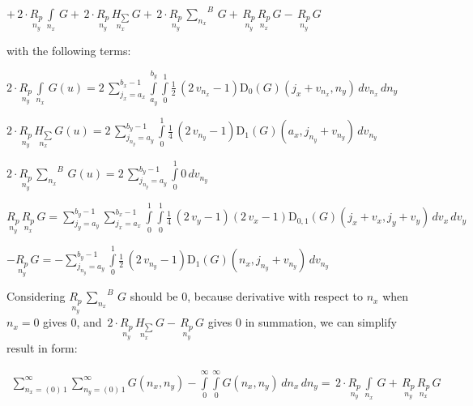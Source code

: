 \documentclass[11pt]{article}
\begin{document}
    \(+\,2\cdot\underset{n_y}{R_{p}}\,\int\limits_{n_x}^{}\,G +\,2\cdot\underset{n_y}{R_{p}}\,\underset{n_x}{H_{\sum}}\,G +\,2\cdot\underset{n_y}{R_{p}}\,{\sum\limits_{n_x}^{}}^{B}\,G +\,\underset{n_y}{R_{p}}\,\underset{n_x}{R_{p}}\,G -\,\underset{n_y}{R_{p}}\,G\)

    with the following terms:

\(2\cdot\underset{n_y}{R_{p}}\,\int\limits_{n_x}^{}\,G\left(u\right) = 2 \, {\sum\limits_{j_{x}=a_{x}}^{b_{x} - 1} \int\limits_{a_{y}}^{b_{y}} \int\limits_{0}^{1} \frac{1}{2} \, {\left(2 \, v_{n_{x}} - 1\right)} \mathrm{D}_{0}\left(G\right)\left(j_{x} + v_{n_{x}}, n_{y}\right)\,{d v_{n_{x}}}\,{d n_{y}}}\)

\(2\cdot\underset{n_y}{R_{p}}\,\underset{n_x}{H_{\sum}}\,G\left(u\right) = 2 \, {\sum\limits_{j_{n_{y}}=a_{y}}^{b_{y} - 1} \int\limits_{0}^{1} \frac{1}{4} \, {\left(2 \, v_{n_{y}} - 1\right)} \mathrm{D}_{1}\left(G\right)\left(a_{x}, j_{n_{y}} + v_{n_{y}}\right)\,{d v_{n_{y}}}}\)

\(2\cdot\underset{n_y}{R_{p}}\,{\sum\limits_{n_x}^{}}^{B}\,G\left(u\right) = 2 \, {\sum\limits_{j_{n_{y}}=a_{y}}^{b_{y} - 1} \int\limits_{0}^{1} 0\,{d v_{n_{y}}}}\)

\(\underset{n_y}{R_{p}}\,\underset{n_x}{R_{p}}\,G = {\sum\limits_{j_{y}=a_{y}}^{b_{y} - 1} {\sum\limits_{j_{x}=a_{x}}^{b_{x} - 1} \int\limits_{0}^{1} \int\limits_{0}^{1} \frac{1}{4} \, {\left(2 \, v_{y} - 1\right)} {\left(2 \, v_{x} - 1\right)} \mathrm{D}_{0, 1}\left(G\right)\left(j_{x} + v_{x}, j_{y} + v_{y}\right)\,{d v_{x}}}\,{d v_{y}}}\)

\(-\underset{n_y}{R_{p}}\,G = -{\sum\limits_{j_{n_{y}}=a_{y}}^{b_{y} - 1} \int\limits_{0}^{1} \frac{1}{2} \, {\left(2 \, v_{n_{y}} - 1\right)} \mathrm{D}_{1}\left(G\right)\left(n_{x}, j_{n_{y}} + v_{n_{y}}\right)\,{d v_{n_{y}}}}\)

    Considering \(\underset{n_y}{R_{p}}\,{\sum\limits_{n_x}^{}}^{B}\,G\)
should be \(0\), because derivative with respect to \(n_x\) when
\(n_x = 0\) gives \(0\), and
\(\,2\cdot\underset{n_y}{R_{p}}\,\underset{n_x}{H_{\sum}}\,G -\,\underset{n_y}{R_{p}}\,G\)
gives \(0\) in summation, we can simplify result in form:

    \begin{equation}
\begin{array}{r}
\sum\limits_{n_x=\left(0\right)\,1}^{\infty}
\sum\limits_{n_y=\left(0\right)\,1}^{\infty}
G\left(n_x, n_y\right)
-
\int\limits_{0}^{\infty}
\int\limits_{0}^{\infty}
G\left(n_x, n_y\right)\,d{n_x}\,d{n_y} =
\,2\cdot\underset{n_y}{R_{p}}\,\int\limits_{n_x}^{}\,G 
+\,\underset{n_y}{R_{p}}\,\underset{n_x}{R_{p}}\,G
\end{array}
\end{equation}
\end{document}
